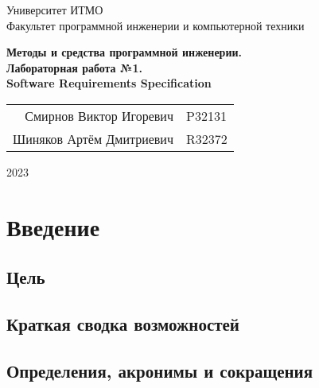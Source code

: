 \documentclass{article}
\begin{document}
\begin{titlepage}
  \begin{center}
    \begin{spacing}{1.4}
      \large{Университет ИТМО} \\
      \large{Факультет программной инженерии и компьютерной техники} \\
    \end{spacing}    
    \vfill
    \textbf{
      \huge{Методы и средства программной инженерии.} \\
      \huge{Лабораторная работа №1.} \\
      \huge{Software Requirements Specification} \\
    }
  \end{center}
  \vfill
  \begin{center}
    \begin{tabular}{r l}
      Смирнов Виктор Игоревич  & P32131 \\
      Шиняков Артём Дмитриевич & R32372 \\
    \end{tabular}
  \end{center}
  \vfill
  \begin{center}
    \begin{large}
      2023
    \end{large}
  \end{center}
\end{titlepage}

\tableofcontents

\section{Введение}

  \subsection{Цель}
  

  \subsection{Краткая сводка возможностей}
  

  \subsection{Определения, акронимы и сокращения}
  
\end{document}
